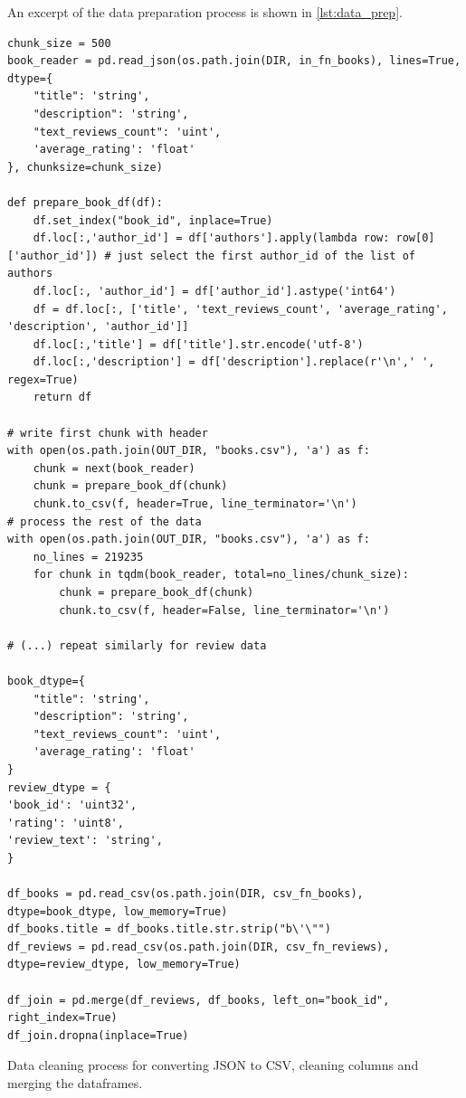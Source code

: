 \documentclass[10pt,final,journal,a4paper,oneside,twocolumn]{IEEEtran}
\begin{document}
An excerpt of the data preparation process is shown in \autoref{lst:data_prep}.

\begin{listing}[h]
    \begin{verbatim}
chunk_size = 500
book_reader = pd.read_json(os.path.join(DIR, in_fn_books), lines=True, dtype={
    "title": 'string', 
    "description": 'string', 
    "text_reviews_count": 'uint', 
    'average_rating': 'float'
}, chunksize=chunk_size)

def prepare_book_df(df):
    df.set_index("book_id", inplace=True)
    df.loc[:,'author_id'] = df['authors'].apply(lambda row: row[0]['author_id']) # just select the first author_id of the list of authors
    df.loc[:, 'author_id'] = df['author_id'].astype('int64')
    df = df.loc[:, ['title', 'text_reviews_count', 'average_rating', 'description', 'author_id']]
    df.loc[:,'title'] = df['title'].str.encode('utf-8')
    df.loc[:,'description'] = df['description'].replace(r'\n',' ', regex=True) 
    return df

# write first chunk with header
with open(os.path.join(OUT_DIR, "books.csv"), 'a') as f:
    chunk = next(book_reader)
    chunk = prepare_book_df(chunk)
    chunk.to_csv(f, header=True, line_terminator='\n')  
# process the rest of the data
with open(os.path.join(OUT_DIR, "books.csv"), 'a') as f:
    no_lines = 219235
    for chunk in tqdm(book_reader, total=no_lines/chunk_size):
        chunk = prepare_book_df(chunk)
        chunk.to_csv(f, header=False, line_terminator='\n')

# (...) repeat similarly for review data

book_dtype={
    "title": 'string', 
    "description": 'string', 
    "text_reviews_count": 'uint', 
    'average_rating': 'float'
}
review_dtype = {
'book_id': 'uint32',
'rating': 'uint8',
'review_text': 'string',
}

df_books = pd.read_csv(os.path.join(DIR, csv_fn_books), dtype=book_dtype, low_memory=True)
df_books.title = df_books.title.str.strip("b\'\"") 
df_reviews = pd.read_csv(os.path.join(DIR, csv_fn_reviews), dtype=review_dtype, low_memory=True)

df_join = pd.merge(df_reviews, df_books, left_on="book_id", right_index=True)
df_join.dropna(inplace=True)
    \end{verbatim}
\caption{Data cleaning process for converting JSON to CSV, cleaning columns and merging the dataframes.}
\label{lst:data_prep}
\end{listing}
\end{document}

